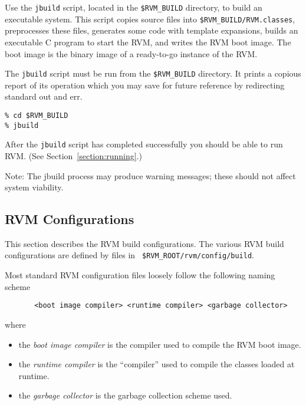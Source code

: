 \begin{enumerate}
Use the {\tt jbuild} script, located in the {\tt \$RVM\_BUILD} directory,
to build an executable system.  This script copies source files into
{\tt \$RVM\_BUILD/RVM.classes}, preprocesses these files, generates
some code with template expansions, builds an executable C program to
start the RVM, and writes the RVM boot image.  The boot image is the
binary image of a ready-to-go instance of the RVM.

The {\tt jbuild} script must be run from the {\tt \$RVM\_BUILD}
directory. It prints a copious report of its operation which you may
save for future reference by redirecting standard out and err.

\begin{verbatim}
% cd $RVM_BUILD
% jbuild
\end{verbatim}


After the {\tt jbuild} script has completed successfully you should be able 
to run RVM.  (See Section~\ref{section:running}.)

Note: The jbuild process may produce warning messages; these should not
affect system viability.

\end{enumerate}

\JikesTMFooter

\AIXTMFooter

\PowerPCTMFooter

\subsection{RVM Configurations}\label{configs}

This section describes the RVM build configurations.  The various RVM
build configurations are defined by files in {\tt
\$RVM\_ROOT/rvm/config/build}.

Most standard RVM configuration files loosely follow the following naming scheme
\begin{verbatim}
       <boot image compiler> <runtime compiler> <garbage collector>
\end{verbatim}

where
\begin{itemize}
\item the {\em boot image compiler} is the compiler used to compile the RVM boot image.
\item the {\em runtime compiler} is the ``compiler'' used to compile
the classes loaded at runtime.  
\item the {\em garbage collector} is the garbage collection scheme used.
\end{itemize}

